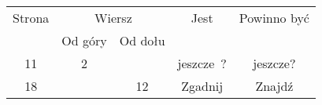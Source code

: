 \documentclass[a4paper,11pt]{article}
\numberwithin{equation}{section}
\newtheorem{corollary}{Wniosek}
\begin{document}





























\newpage



\begin{center}

  \begin{tabular}{|c|c|c|c|c|}
    \hline
    Strona & \multicolumn{2}{c|}{Wiersz} & Jest
                              & Powinno być \\ \cline{2-3}
    & Od góry & Od dołu & & \\
    \hline
    11 & \hphantom{0}2 & & jeszcze~? & jeszcze? \\
    18 & & 12 & Zgadnij & Znajdź \\
    \hline
  \end{tabular}







\end{center}
\end{document}
